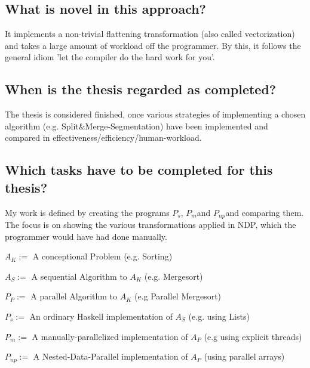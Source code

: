 \documentclass{article}
\newcommand{\seq}[0]{$P_{s}$}
\renewcommand{\mp}[0]{$P_{m}$}
\newcommand{\ndp}[0]{$P_{np}$}
\newcommand{\note}[1]{{\tiny (#1)}}
\newcommand{\algo}[0]{Split\&Merge-Segmentation}
\begin{document}
    

    \subsection{What is novel in this approach?}
    It implements a non-trivial flattening transformation (also called vectorization) and takes a large amount of workload off the programmer.
    By this, it follows the general idiom 'let the compiler do the hard work for you'.
    
    \subsection{When is the thesis regarded as completed?}
    The thesis is considered finished, once various strategies of
    implementing a chosen algorithm (e.g. \algo) have been
    implemented and compared in effectiveness/efficiency/human-workload.
    
    \subsection{Which tasks have to be completed for this thesis?}
    My work is defined by creating the programs \seq, \mp and \ndp and comparing them.
    The focus is on showing the various transformations applied in NDP, which the programmer would have had done manually.
    
        $A_{K} :=$ A conceptional Problem \note{e.g. Sorting}
        
        $A_{S} :=$ A sequential Algorithm to $A_{K}$ \note{e.g. Mergesort}
        
        $P_{P} :=$ A parallel Algorithm to $A_{K}$ \note{e.g Parallel Mergesort}
        
        \seq $:=$ An ordinary Haskell implementation of $A_{S}$ \note{e.g. using Lists}

        \mp $:=$ A manually-parallelized implementation of $A_{P}$ \note{e.g using explicit threads}
        
        \ndp $:=$ A Nested-Data-Parallel implementation of $A_{P}$ \note{using parallel arrays}
        
\end{document}
